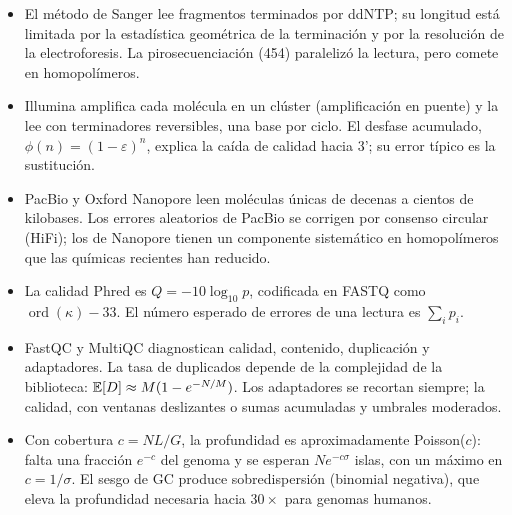 \begin{resumen}
\begin{itemize}
  \item El método de Sanger lee fragmentos terminados por ddNTP; su longitud está limitada por la estadística geométrica de la terminación y por la resolución de la electroforesis. La pirosecuenciación (454) paralelizó la lectura, pero comete  en homopolímeros.
  \item Illumina amplifica cada molécula en un clúster (amplificación en puente) y la lee con terminadores reversibles, una base por ciclo. El desfase acumulado, $\phi(n)=(1-\varepsilon)^n$, explica la caída de calidad hacia 3'; su error típico es la sustitución.
  \item PacBio y Oxford Nanopore leen moléculas únicas de decenas a cientos de kilobases. Los errores aleatorios de PacBio se corrigen por consenso circular (HiFi); los de Nanopore tienen un componente sistemático en homopolímeros que las químicas recientes han reducido.
  \item La calidad Phred es $Q=-10\log_{10}p$, codificada en FASTQ como $\operatorname{ord}(\kappa)-33$. El número esperado de errores de una lectura es $\sum_i p_i$.
  \item FastQC y MultiQC diagnostican calidad, contenido, duplicación y adaptadores. La tasa de duplicados depende de la complejidad de la biblioteca: $\mathbb{E}[D]\approx M(1-e^{-N/M})$. Los adaptadores se recortan siempre; la calidad, con ventanas deslizantes o sumas acumuladas y umbrales moderados.
  \item Con cobertura $c=NL/G$, la profundidad es aproximadamente Poisson($c$): falta una fracción $e^{-c}$ del genoma y se esperan $Ne^{-c\sigma}$ islas, con un máximo en $c=1/\sigma$. El sesgo de GC produce sobredispersión (binomial negativa), que eleva la profundidad necesaria hacia $30\times$ para genomas humanos.
\end{itemize}
\end{resumen}

